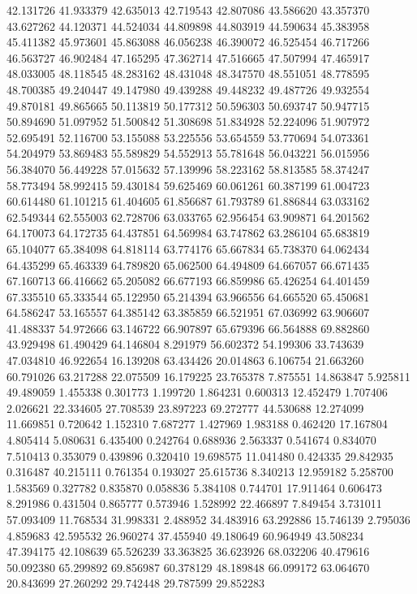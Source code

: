 42.131726
41.933379
42.635013
42.719543
42.807086
43.586620
43.357370
43.627262
44.120371
44.524034
44.809898
44.803919
44.590634
45.383958
45.411382
45.973601
45.863088
46.056238
46.390072
46.525454
46.717266
46.563727
46.902484
47.165295
47.362714
47.516665
47.507994
47.465917
48.033005
48.118545
48.283162
48.431048
48.347570
48.551051
48.778595
48.700385
49.240447
49.147980
49.439288
49.448232
49.487726
49.932554
49.870181
49.865665
50.113819
50.177312
50.596303
50.693747
50.947715
50.894690
51.097952
51.500842
51.308698
51.834928
52.224096
51.907972
52.695491
52.116700
53.155088
53.225556
53.654559
53.770694
54.073361
54.204979
53.869483
55.589829
54.552913
55.781648
56.043221
56.015956
56.384070
56.449228
57.015632
57.139996
58.223162
58.813585
58.374247
58.773494
58.992415
59.430184
59.625469
60.061261
60.387199
61.004723
60.614480
61.101215
61.404605
61.856687
61.793789
61.886844
63.033162
62.549344
62.555003
62.728706
63.033765
62.956454
63.909871
64.201562
64.170073
64.172735
64.437851
64.569984
63.747862
63.286104
65.683819
65.104077
65.384098
64.818114
63.774176
65.667834
65.738370
64.062434
64.435299
65.463339
64.789820
65.062500
64.494809
64.667057
66.671435
67.160713
66.416662
65.205082
66.677193
66.859986
65.426254
64.401459
67.335510
65.333544
65.122950
65.214394
63.966556
64.665520
65.450681
64.586247
53.165557
64.385142
63.385859
66.521951
67.036992
63.906607
41.488337
54.972666
63.146722
66.907897
65.679396
66.564888
69.882860
43.929498
61.490429
64.146804
8.291979
56.602372
54.199306
33.743639
47.034810
46.922654
16.139208
63.434426
20.014863
6.106754
21.663260
60.791026
63.217288
22.075509
16.179225
23.765378
7.875551
14.863847
5.925811
49.489059
1.455338
0.301773
1.199720
1.864231
0.600313
12.452479
1.707406
2.026621
22.334605
27.708539
23.897223
69.272777
44.530688
12.274099
11.669851
0.720642
1.152310
7.687277
1.427969
1.983188
0.462420
17.167804
4.805414
5.080631
6.435400
0.242764
0.688936
2.563337
0.541674
0.834070
7.510413
0.353079
0.439896
0.320410
19.698575
11.041480
0.424335
29.842935
0.316487
40.215111
0.761354
0.193027
25.615736
8.340213
12.959182
5.258700
1.583569
0.327782
0.835870
0.058836
5.384108
0.744701
17.911464
0.606473
8.291986
0.431504
0.865777
0.573946
1.528992
22.466897
7.849454
3.731011
57.093409
11.768534
31.998331
2.488952
34.483916
63.292886
15.746139
2.795036
4.859683
42.595532
26.960274
37.455940
49.180649
60.964949
43.508234
47.394175
42.108639
65.526239
33.363825
36.623926
68.032206
40.479616
50.092380
65.299892
69.856987
60.378129
48.189848
66.099172
63.064670
20.843699
27.260292
29.742448
29.787599
29.852283
